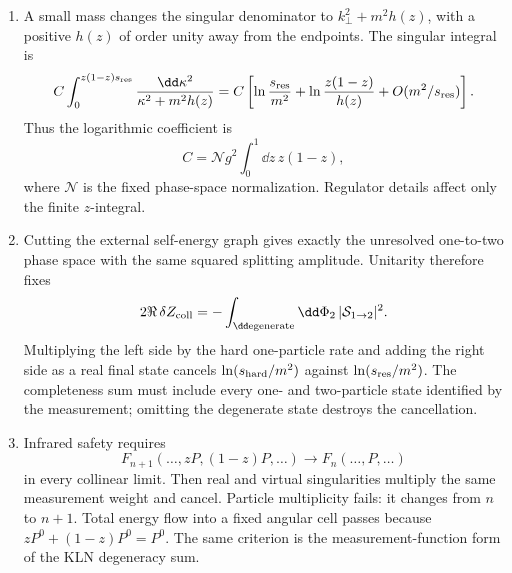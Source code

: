 \begin{enumerate}
\begin{enumerate}
\item
A small mass changes the singular denominator to
\(k_\perp^2+m^2h(z)\), with a positive \(h(z)\) of order unity away from
the endpoints.  The singular integral is
\[
 C\int_0^{z(1-z)s_{\rm res}}
 \frac{\dd\kappa^2}{\kappa^2+m^2h(z)}
 =C\left[\ln\frac{s_{\rm res}}{m^2}
 +\ln\frac{z(1-z)}{h(z)}+O(m^2/s_{\rm res})\right].
\]
Thus the logarithmic coefficient is
\[
 C=\mathcal N g^2\int_0^1\dd z\,z(1-z),
\]
where \(\mathcal N\) is the fixed phase-space normalization.  Regulator
details affect only the finite \(z\)-integral.
\item
Cutting the external self-energy graph gives exactly the unresolved
one-to-two phase space with the same squared splitting amplitude.  Unitarity
therefore fixes
\[
 2\Re\,\delta Z_{\rm coll}
 =-\int_{\rm \dd egenerate}\dd\Phi_2\,|\mathcal S_{1\to2}|^2.
\]
Multiplying the left side by the hard one-particle rate and adding the
right side as a real final state cancels
\(\ln(s_{\rm hard}/m^2)\) against
\(\ln(s_{\rm res}/m^2)\).  The completeness sum must include every
one- and two-particle state identified by the measurement; omitting the
degenerate state destroys the cancellation.
\item
Infrared safety requires
\[
 F_{n+1}(\ldots,zP,(1-z)P,\ldots)
 \longrightarrow F_n(\ldots,P,\ldots)
\]
in every collinear limit.  Then real and virtual singularities multiply
the same measurement weight and cancel.  Particle multiplicity fails:
it changes from \(n\) to \(n+1\).  Total energy flow into a fixed angular
cell passes because \(zP^0+(1-z)P^0=P^0\).  The same criterion is the
measurement-function form of the KLN degeneracy sum.
\end{enumerate}


\end{enumerate}
